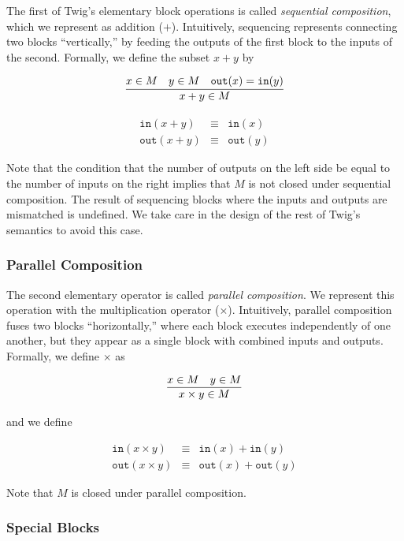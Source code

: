 The first of Twig's elementary block operations is called  \emph{sequential composition}, which we represent as addition ($+$). Intuitively, sequencing represents connecting two blocks  ``vertically,'' by feeding the outputs of the first block to the inputs of the second. Formally, we define the subset $x+y$ by

\[
\infer
  {x+y \in M}
  {x \in M \quad y \in M \quad \mathtt{out}(x) = \mathtt{in}(y)}
\]

\begin{eqnarray*}
\mathtt{in} (x+y) &\equiv& \mathtt{in}(x)\\
\mathtt{out}(x+y) &\equiv& \mathtt{out}(y)
\end{eqnarray*}

Note that the condition that the number of outputs on the left side be equal to the number of inputs on the right implies that $M$ is not closed under sequential composition. The result of sequencing blocks where the inputs and outputs are mismatched is undefined. We take care in the design of the rest of Twig's semantics to avoid this case.

\subsubsection{Parallel Composition}

The second elementary operator is called \emph{parallel composition}. We represent this operation with the multiplication operator ($\times$). Intuitively, parallel composition fuses two blocks ``horizontally,'' where each block executes independently of one another, but they appear as a single block with combined inputs and outputs. Formally, we define $\times$ as

\[
\infer
  {x \times y \in M}
  {x \in M \quad y \in M}
\]

and we define

\begin{eqnarray*}
\mathtt{in} (x \times y) &\equiv& \mathtt{in}(x)  + \mathtt{in}(y)\\ 
\mathtt{out}(x \times y) &\equiv& \mathtt{out}(x) + \mathtt{out}(y) \end{eqnarray*}

Note that $M$ is closed under parallel composition.

\subsubsection{Special Blocks}
\label{sec:code-gen:special}

